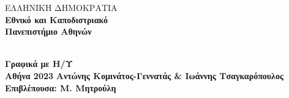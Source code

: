 \begin{titlepage}
		\begin{center}
			\begin{minipage}{0.15\textwidth}
			\end{minipage}
			\begin{minipage}{0.40\textwidth}
				\centering
				ΕΛΛΗΝΙΚΗ ΔΗΜΟΚΡΑΤΙΑ\\
				\large{\textbf{Εθνικό και Καποδιστριακό\\Πανεπιστήμιο Αθηνών}}\\[2mm]
			\end{minipage}
			\hRule
			\vspace{10pt}
			\\
			\Large{\textbf{Γραφικά με Η/Υ}} \\[4mm]
			\large{\textbf{Αθήνα 2023}}
			\vfill
			\normalsize{\textbf{Αντώνης Κομινάτος-Γεννατάς \&  Ιωάννης Τσαγκαρόπουλος }}\\[4mm]
			\small{\textbf{Επιβλέπουσα: Μ. Μητρούλη}}
		\end{center}
	\end{titlepage}